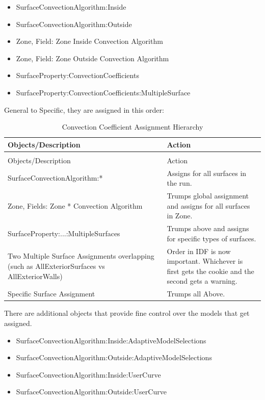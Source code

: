 \begin{itemize}
\item
  SurfaceConvectionAlgorithm:Inside
\item
  SurfaceConvectionAlgorithm:Outside
\item
  Zone, Field: Zone Inside Convection Algorithm
\item
  Zone, Field: Zone Outside Convection Algorithm
\item
  SurfaceProperty:ConvectionCoefficients
\item
  SurfaceProperty:ConvectionCoefficients:MultipleSurface
\end{itemize}

General to Specific, they are assigned in this order:

\begin{longtable}[c]{p{2.96in}p{3.03in}}
\caption{Convection Coefficient Assignment Hierarchy \label{table:convection-coefficient-assignment-hierarchy}} \tabularnewline
\toprule 
Objects/Description & Action \tabularnewline
\midrule
\endfirsthead

\caption[]{Convection Coefficient Assignment Hierarchy} \tabularnewline
\toprule 
Objects/Description & Action \tabularnewline
\midrule
\endhead

SurfaceConvectionAlgorithm:* & Assigns for all surfaces in the run. \tabularnewline
Zone, Fields: Zone * Convection Algorithm & Trumps global assignment and assigns for all surfaces in Zone. \tabularnewline
SurfaceProperty:...:MultipleSurfaces & Trumps above and assigns for specific types of surfaces. \tabularnewline
Two Multiple Surface Assignments overlapping (such as AllExteriorSurfaces vs AllExteriorWalls) & Order in IDF is now important. Whichever is first gets the cookie and the second gets a warning. \tabularnewline
Specific Surface Assignment & Trumps all Above. \tabularnewline
\bottomrule
\end{longtable}

There are additional objects that provide fine control over the models that get assigned.

\begin{itemize}
\item
  SurfaceConvectionAlgorithm:Inside:AdaptiveModelSelections
\item
  SurfaceConvectionAlgorithm:Outside:AdaptiveModelSelections
\item
  SurfaceConvectionAlgorithm:Inside:UserCurve
\item
  SurfaceConvectionAlgorithm:Outside:UserCurve
\end{itemize}

